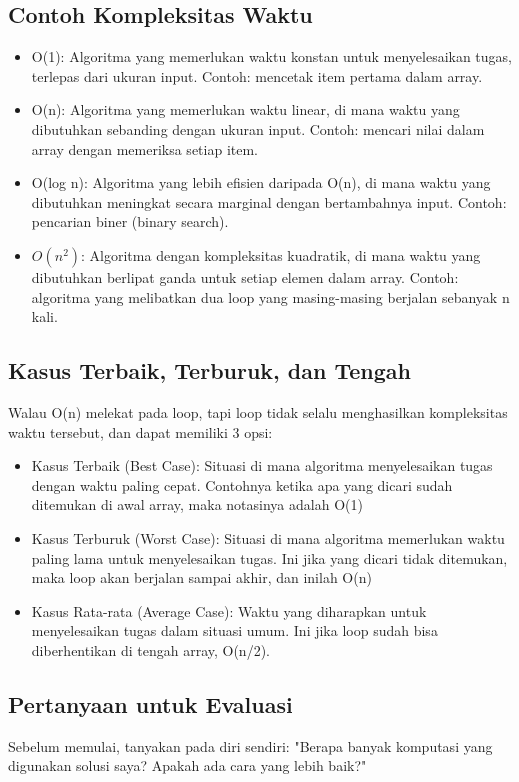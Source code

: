 \documentclass{article}
\begin{document}
\subsection{Contoh Kompleksitas Waktu}
\begin{itemize}
    \item O(1): Algoritma yang memerlukan waktu konstan untuk menyelesaikan tugas, terlepas dari ukuran input. Contoh: mencetak item pertama dalam array.
    \item O(n): Algoritma yang memerlukan waktu linear, di mana waktu yang dibutuhkan sebanding dengan ukuran input. Contoh: mencari nilai dalam array dengan memeriksa setiap item.
    \item O(log n): Algoritma yang lebih efisien daripada O(n), di mana waktu yang dibutuhkan meningkat secara marginal dengan bertambahnya input. Contoh: pencarian biner (binary search).
    \item \(O(n^2)\): Algoritma dengan kompleksitas kuadratik, di mana waktu yang dibutuhkan berlipat ganda untuk setiap elemen dalam array. Contoh: algoritma yang melibatkan dua loop yang masing-masing berjalan sebanyak n kali.
\end{itemize}

\subsection{Kasus Terbaik, Terburuk, dan Tengah}
Walau O(n) melekat pada loop, tapi loop tidak selalu menghasilkan kompleksitas waktu tersebut, dan dapat memiliki 3 opsi:
\begin{itemize}
    \item Kasus Terbaik (Best Case): Situasi di mana algoritma menyelesaikan tugas dengan waktu paling cepat. Contohnya ketika apa yang dicari sudah ditemukan di awal array, maka notasinya adalah O(1)
    \item Kasus Terburuk (Worst Case): Situasi di mana algoritma memerlukan waktu paling lama untuk menyelesaikan tugas. Ini jika yang dicari tidak ditemukan, maka loop akan berjalan sampai akhir, dan inilah O(n)
    \item Kasus Rata-rata (Average Case): Waktu yang diharapkan untuk menyelesaikan tugas dalam situasi umum. Ini jika loop sudah bisa diberhentikan di tengah array, O(n/2).
\end{itemize}

\subsection{Pertanyaan untuk Evaluasi}
Sebelum memulai, tanyakan pada diri sendiri: "Berapa banyak komputasi yang digunakan solusi saya? Apakah ada cara yang lebih baik?"
\end{document}
